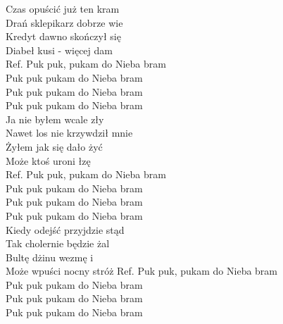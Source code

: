 
Czas opuścić już ten kram \\
Drań sklepikarz dobrze wie \\
Kredyt dawno skończył się \\
Diabeł kusi - więcej dam \\
\hops
Ref. Puk puk, pukam do Nieba bram\\
 Puk puk pukam do Nieba bram\\
 Puk puk pukam do Nieba bram\\
 Puk puk pukam do Nieba bram\\
\hops
Ja nie byłem wcale zły\\
Nawet los nie krzywdził mnie\\
Żyłem jak się dało żyć\\
Może ktoś uroni łzę\\
\hops
Ref. Puk puk, pukam do Nieba bram\\
 Puk puk pukam do Nieba bram\\
 Puk puk pukam do Nieba bram\\
 Puk puk pukam do Nieba bram\\
\hops
Kiedy odejść przyjdzie stąd\\
Tak cholernie będzie żal\\
Bultę dżinu wezmę i\\
Może wpuści nocny stróż
\hops
Ref. Puk puk, pukam do Nieba bram\\
 Puk puk pukam do Nieba bram\\
 Puk puk pukam do Nieba bram\\
 Puk puk pukam do Nieba bram